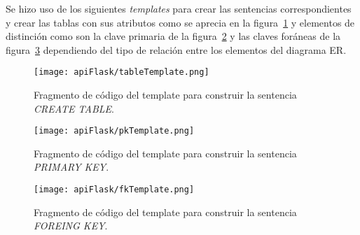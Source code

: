 Se hizo uso de los siguientes \textit{templates} para crear las sentencias correspondientes y crear las tablas con sus atributos como se aprecia en la figura~\ref{img:templateTable} y elementos de distinción como son la clave primaria de la figura~\ref{img:pkTemplate} y las claves foráneas de la figura~\ref{img:fkTemplate} dependiendo del tipo de relación entre los elementos del diagrama ER.


\begin{figure}[H]
  \centering
  \texttt{[image: apiFlask/tableTemplate.png]}
  \caption{Fragmento de código del template para construir la sentencia \textit{CREATE TABLE}.}
  \label{img:templateTable}
\end{figure}

\begin{figure}[H]
  \centering
  \texttt{[image: apiFlask/pkTemplate.png]}
  \caption{Fragmento de código del template para construir la sentencia \textit{PRIMARY KEY}.}
  \label{img:pkTemplate}
\end{figure}

\begin{figure}[H]
  \centering
  \texttt{[image: apiFlask/fkTemplate.png]}
  \caption{Fragmento de código del template para construir la sentencia \textit{FOREING KEY}.}
  \label{img:fkTemplate}
\end{figure}